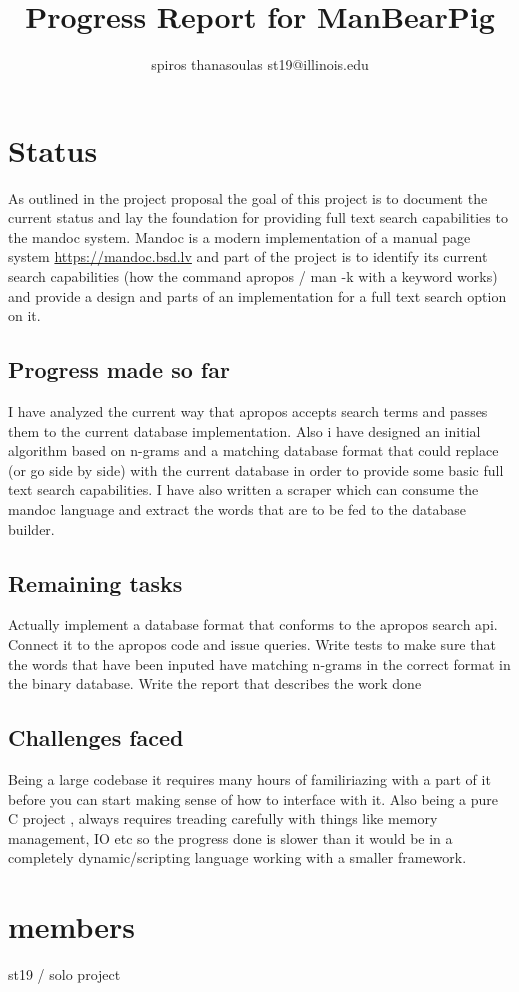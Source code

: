 \documentclass{report}
\begin{document}
\title{Progress Report for ManBearPig}
\author{spiros thanasoulas st19@illinois.edu}
\maketitle

\section*{Status}
As outlined in the project proposal the goal of this project is to document the current status and lay the foundation for providing
full text search capabilities to the mandoc system. 
Mandoc is a modern implementation of a manual page system \url{https://mandoc.bsd.lv} and part of the project is to identify its current
search capabilities (how the command apropos / man -k with a keyword works) and provide a design and parts of an implementation for
a full text search option on it.

\subsection*{Progress made so far}
I have analyzed the current way that apropos accepts search terms and passes them to the current database implementation.
Also i have designed an initial algorithm based on n-grams and a matching database format that could replace (or go side by side)
with the current database in order to provide some basic full text search capabilities. I have also written a scraper which 
can consume the mandoc language and extract the words that are to be fed to the database builder.


\subsection*{Remaining tasks}
Actually implement a database format that conforms to the apropos search api. 
Connect it to the apropos code and issue queries.
Write tests to make sure that the words that have been inputed have matching n-grams in the correct format in the 
binary database.
Write the report that describes the work done 

\subsection*{Challenges faced}
Being a large codebase it requires many hours of familiriazing with a part of it before you can start
making sense of how to interface with it.
Also being a pure C project , always requires treading carefully with things like memory management, IO etc
so the progress done is slower than it would be in a completely dynamic/scripting language working with a smaller framework.

\section*{members}
st19 / solo project 
\end{document}
